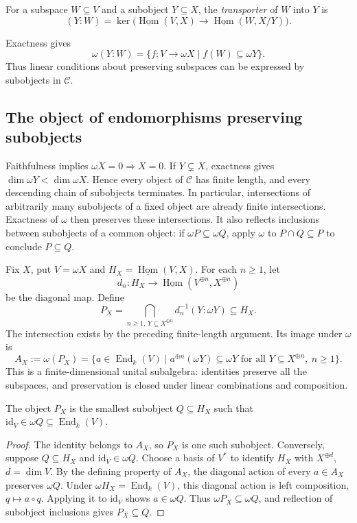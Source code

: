\begin{definition}
For a subspace $W\subseteq V$ and a subobject $Y\subseteq X$, the \emph{transporter} of $W$ into $Y$ is
\[
 (Y:W)=\ker\bigl(\underline{\operatorname{Hom}}(V,X)
 \longrightarrow\underline{\operatorname{Hom}}(W,X/Y)\bigr).
\]
\end{definition}
Exactness gives
\[
 \omega(Y:W)=\{f:V\to\omega X\mid f(W)\subseteq\omega Y\}.
\]
Thus linear conditions about preserving subspaces can be expressed by subobjects in $\mathcal C$.

\subsection*{The object of endomorphisms preserving subobjects}
Faithfulness implies $\omega X=0\Rightarrow X=0$. If $Y\subsetneq X$, exactness gives $\dim\omega Y<\dim\omega X$. Hence every object of $\mathcal C$ has finite length, and every descending chain of subobjects terminates. In particular, intersections of arbitrarily many subobjects of a fixed object are already finite intersections. Exactness of $\omega$ then preserves these intersections. It also reflects inclusions between subobjects of a common object: if $\omega P\subseteq\omega Q$, apply $\omega$ to $P\cap Q\subseteq P$ to conclude $P\subseteq Q$.

Fix $X$, put $V=\omega X$ and $H_X=\underline{\operatorname{Hom}}(V,X)$. For each $n\geq1$, let
\[
 d_n:H_X\longrightarrow
 \underline{\operatorname{Hom}}(V^{\oplus n},X^{\oplus n})
\]
be the diagonal map. Define
\[
 P_X=\bigcap_{n\geq1,\,Y\subseteq X^{\oplus n}}
 d_n^{-1}(Y:\omega Y)\subseteq H_X.
\]
The intersection exists by the preceding finite-length argument. Its image under $\omega$ is
\[
 A_X:=\omega(P_X)
 =\{a\in\operatorname{End}_k(V)\mid
 a^{\oplus n}(\omega Y)\subseteq\omega Y
 \text{ for all }Y\subseteq X^{\oplus n},\ n\geq1\}.
\]
This is a finite-dimensional unital subalgebra: identities preserve all the subspaces, and preservation is closed under linear combinations and composition.

\begin{lemma}\label{lem:minimal-PX}
The object $P_X$ is the smallest subobject $Q\subseteq H_X$ such that $\mathrm{id}_V\in\omega Q\subseteq\operatorname{End}_k(V)$.
\end{lemma}
\begin{proof}
The identity belongs to $A_X$, so $P_X$ is one such subobject. Conversely, suppose $Q\subseteq H_X$ and $\mathrm{id}_V\in\omega Q$. Choose a basis of $V^*$ to identify $H_X$ with $X^{\oplus d}$, $d=\dim V$. By the defining property of $A_X$, the diagonal action of every $a\in A_X$ preserves $\omega Q$. Under $\omega H_X=\operatorname{End}_k(V)$, this diagonal action is left composition, $q\mapsto a\circ q$. Applying it to $\mathrm{id}_V$ shows $a\in\omega Q$. Thus $\omega P_X\subseteq\omega Q$, and reflection of subobject inclusions gives $P_X\subseteq Q$.
\end{proof}

